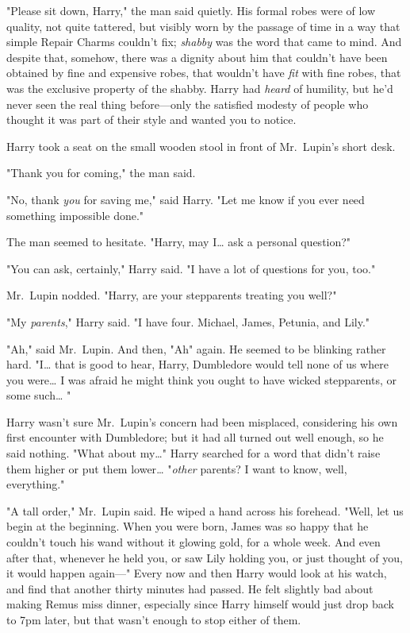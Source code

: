 "Please sit down, Harry," the man said quietly. His formal robes were of low 
quality, not quite tattered, but visibly worn by the passage of time in a way 
that simple Repair Charms couldn't fix; \emph{shabby} was the word that came to 
mind. And despite that, somehow, there was a dignity about him that couldn't 
have been obtained by fine and expensive robes, that wouldn't have \emph{fit} 
with fine robes, that was the exclusive property of the shabby. Harry had 
\emph{heard} of humility, but he'd never seen the real thing before---only the 
satisfied modesty of people who thought it was part of their style and wanted 
you to notice.

Harry took a seat on the small wooden stool in front of Mr.~Lupin's short desk.

"Thank you for coming," the man said.

"No, thank \emph{you} for saving me," said Harry. "Let me know if you ever need 
something impossible done."

The man seemed to hesitate. "Harry, may I{\ldots} ask a personal question?"

"You can ask, certainly," Harry said. "I have a lot of questions for you, too."

Mr.~Lupin nodded. "Harry, are your stepparents treating you well?"

"My \emph{parents}," Harry said. "I have four. Michael, James, Petunia, and 
Lily."

"Ah," said Mr.~Lupin. And then, "Ah" again. He seemed to be blinking rather 
hard. "I{\ldots} that is good to hear, Harry, Dumbledore would tell none of us 
where you were{\ldots} I was afraid he might think you ought to have wicked 
stepparents, or some such{\ldots} "

Harry wasn't sure Mr.~Lupin's concern had been misplaced, considering his own 
first encounter with Dumbledore; but it had all turned out well enough, so he 
said nothing. "What about my{\ldots}" Harry searched for a word that didn't 
raise them higher or put them lower{\ldots} "\emph{other} parents? I want to 
know, well, everything."

"A tall order," Mr.~Lupin said. He wiped a hand across his forehead. "Well, let 
us begin at the beginning. When you were born, James was so happy that he 
couldn't touch his wand without it glowing gold, for a whole week. And even 
after that, whenever he held you, or saw Lily holding you, or just thought of 
you, it would happen again---"
\sbreak
Every now and then Harry would look at his watch, and find that another thirty 
minutes had passed. He felt slightly bad about making Remus miss dinner, 
especially since Harry himself would just drop back to 7pm later, but that 
wasn't enough to stop either of them.

